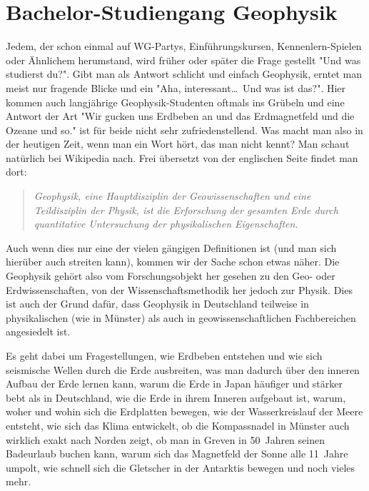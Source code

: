 \section{Bachelor-Studiengang Geophysik}
\begin{multicols}{2}
Jedem, der schon einmal auf WG-Partys, Einführungskursen, Kennenlern-Spielen oder Ähnlichem herumstand, wird früher oder später die Frage gestellt "Und was studierst du?".
Gibt man als Antwort schlicht und einfach Geophysik, erntet man meist nur fragende Blicke und ein "Aha, interessant\dots\ Und was ist das?".
Hier kommen auch langjährige Geophysik-Studenten oftmals ins Grübeln und eine Antwort der Art "Wir gucken uns Erdbeben an und das Erdmagnetfeld und die Ozeane und so." ist für beide nicht sehr zufriedenstellend.
Was macht man also in der heutigen Zeit, wenn man ein Wort hört, das man nicht kennt? Man schaut natürlich bei Wikipedia nach.
Frei übersetzt von der englischen Seite findet man dort:
\vspace*{-0.5cm}
\begin{quote}
	\textit{Geophysik, eine Hauptdisziplin der Geowissenschaften und eine Teildisziplin der Physik, ist die Erforschung der gesamten Erde durch quantitative Untersuchung der physikalischen Eigenschaften.}
\end{quote}

Auch wenn dies nur eine der vielen gängigen Definitionen ist (und man sich hierüber auch streiten kann), kommen wir der Sache schon etwas näher.
Die Geophysik gehört also vom Forschungsobjekt her gesehen zu den Geo- oder Erdwissenschaften, von der Wissenschaftsmethodik her jedoch zur Physik.
Dies ist auch der Grund dafür, dass Geophysik in Deutschland teilweise in physikalischen (wie in Münster) als auch in geowissenschaftlichen Fachbereichen angesiedelt ist.

Es geht dabei um Fragestellungen, wie Erdbeben entstehen und wie sich seismische Wellen durch die Erde ausbreiten, was man dadurch über den inneren Aufbau der Erde lernen kann, warum die Erde in Japan häufiger und stärker bebt als in Deutschland, wie die Erde in ihrem Inneren aufgebaut ist, warum, woher und wohin sich die Erdplatten bewegen, wie der Wasserkreislauf der Meere entsteht, wie sich das Klima entwickelt, ob die Kompassnadel in Münster auch wirklich exakt nach Norden zeigt, ob man in Greven in 50~Jahren seinen Badeurlaub buchen kann, warum sich das Magnetfeld der Sonne alle 11~Jahre umpolt, wie schnell sich die Gletscher in der Antarktis bewegen und noch vieles mehr.


\end{multicols}
